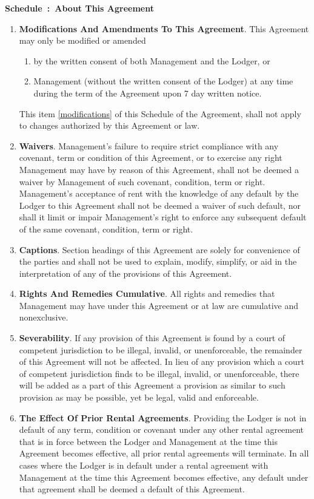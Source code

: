 \documentclass[12pt,letterpaper]{article}
\newcounter{schedulecounter}
\renewcommand{\theschedulecounter}{\Alph{schedulecounter}}
\newenvironment{schedule}[1] {%
	\refstepcounter{schedulecounter}%
	\noindent \textbf{\Large Schedule~\theschedulecounter:~{#1}}
	\noindent
}{}
\newcommand{\meta}{About This Agreement}
\newcommand{\management}{Management}
\begin{document}
\begin{schedule}{\meta{}} \label{meta}
\begin{enumerate}
	\item \textbf{Modifications And Amendments To This Agreement}. \label{modifications}
		This Agreement may only be modified or amended 
		\begin{enumerate}
			\item by the written consent of both \management{} and the Lodger, or 
			\item \management{} (without the written consent of the Lodger) at any time during the term of the Agreement upon 7 day written notice. 
		\end{enumerate}
				
		This item \ref{modifications} of this Schedule of the Agreement, shall not apply to changes authorized by this Agreement or law.
	\item \textbf{Waivers}. 
		\management{}'s failure to require strict compliance with any covenant, term or condition of this Agreement, or to exercise any right \management{} may have by reason of this Agreement, shall not be deemed a waiver by \management{} of such covenant, condition, term or right. \management{}'s acceptance of rent with the knowledge of any default by the Lodger to this Agreement shall not be deemed a waiver of such default, nor shall it limit or impair \management{}'s right to enforce any subsequent default of the same covenant, condition, term or right. 
	\item \textbf{Captions}. 
		Section headings of this Agreement are solely for convenience of the parties and shall not be used to explain, modify, simplify, or aid in the interpretation of any of the provisions of this Agreement. 
	\item \textbf{Rights And Remedies Cumulative}. 
		All rights and remedies that \management{} may have under this Agreement or at law are cumulative and nonexclusive. 
	\item \textbf{Severability}. 
		If any provision of this Agreement is found by a court of competent jurisdiction to be illegal, invalid, or unenforceable, the remainder of this Agreement will not be affected. In lieu of any provision which a court of competent jurisdiction finds to be illegal, invalid, or unenforceable, there will be added as a part of this Agreement a provision as similar to such provision as may be possible, yet be legal, valid and enforceable. 
	\item \textbf{The Effect Of Prior Rental Agreements}. 
		Providing the Lodger is not in default of any term, condition or covenant under any other rental agreement that is in force between the Lodger and \management{} at the time this Agreement becomes effective, all prior rental agreements will terminate. In all cases where the Lodger is in default under a rental agreement with \management{} at the time this Agreement becomes effective, any default under that agreement shall be deemed a default of this Agreement. 
\end{enumerate}
\end{schedule}
\end{document}
